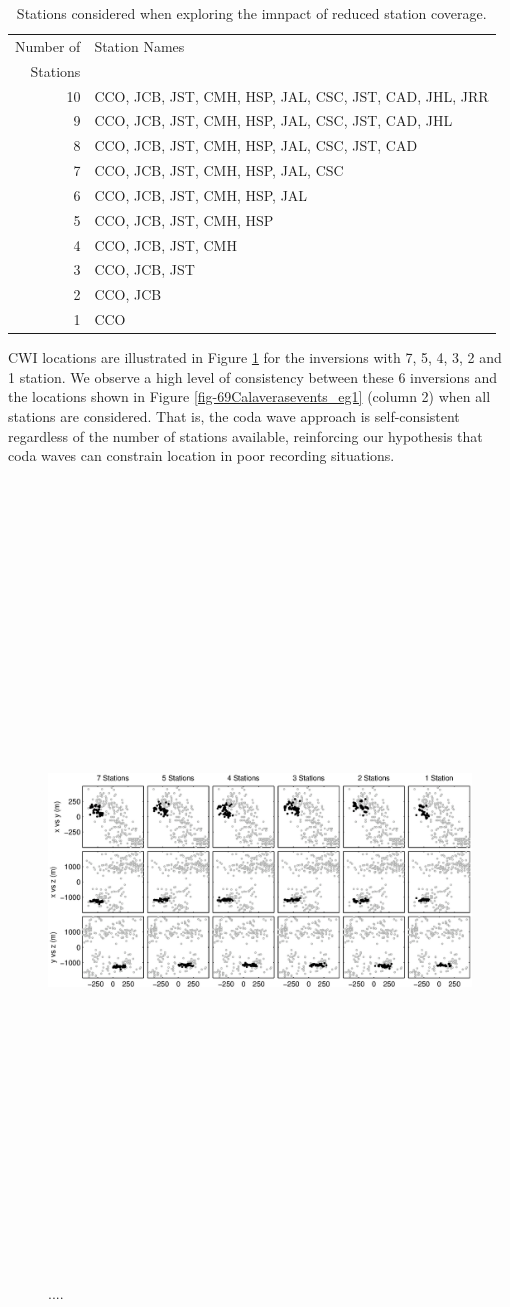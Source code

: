 \documentclass[extra]{gji}
\begin{document}
\begin{table}
\caption{Stations considered when exploring the imnpact of reduced
station coverage.} \label{tab:Calaveras-stationremoval}
\begin{tabular}{|r|l|}
\hline
Number of & Station Names\\
Stations  & \\
\hline
10 & CCO, JCB, JST, CMH, HSP, JAL, CSC, JST, CAD, JHL, JRR\\
9  & CCO, JCB, JST, CMH, HSP, JAL, CSC, JST, CAD, JHL\\
8  & CCO, JCB, JST, CMH, HSP, JAL, CSC, JST, CAD\\
7  & CCO, JCB, JST, CMH, HSP, JAL, CSC \\
6  & CCO, JCB, JST, CMH, HSP, JAL \\
5  & CCO, JCB, JST, CMH, HSP \\
4  & CCO, JCB, JST, CMH \\
3  & CCO, JCB, JST \\
2  & CCO, JCB \\
1  & CCO \\
\hline
\end{tabular}
\end{table}


CWI locations are illustrated in Figure
\ref{fig-CWIreducesstats} for the inversions with 7, 5, 4, 3, 2 and
1 station. We observe a high level of consistency between these 6
inversions and the locations shown in Figure
\ref{fig-69Calaverasevents_eg1} (column 2) when all stations are
considered. That is, the coda wave approach is self-consistent
regardless of the number of stations available, reinforcing our
hypothesis that coda waves can constrain location in poor recording
situations.

\begin{figure}
\includegraphics[angle=90,height = 50pc]{diags/CalaverasLoc2.eps}
\caption{....} \label{fig-CWIreducesstats}
\end{figure}
\end{document}
